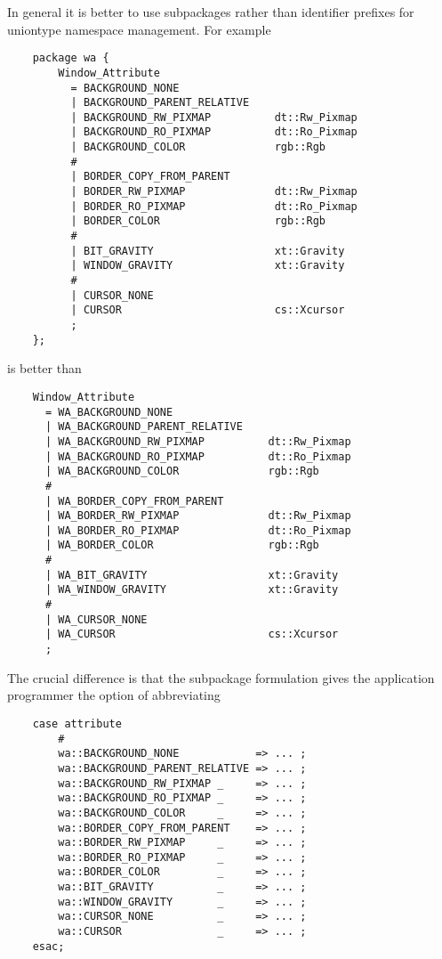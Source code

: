 In general it is better to use subpackages rather than identifier prefixes 
for uniontype namespace management.  For example

\begin{verbatim}
    package wa {
        Window_Attribute
          = BACKGROUND_NONE
          | BACKGROUND_PARENT_RELATIVE
          | BACKGROUND_RW_PIXMAP          dt::Rw_Pixmap
          | BACKGROUND_RO_PIXMAP          dt::Ro_Pixmap
          | BACKGROUND_COLOR              rgb::Rgb
          #
          | BORDER_COPY_FROM_PARENT
          | BORDER_RW_PIXMAP              dt::Rw_Pixmap
          | BORDER_RO_PIXMAP              dt::Ro_Pixmap
          | BORDER_COLOR                  rgb::Rgb
          #
          | BIT_GRAVITY                   xt::Gravity
          | WINDOW_GRAVITY                xt::Gravity
          #
          | CURSOR_NONE
          | CURSOR                        cs::Xcursor
          ;
    };
\end{verbatim}

is better than

\begin{verbatim}
    Window_Attribute
      = WA_BACKGROUND_NONE
      | WA_BACKGROUND_PARENT_RELATIVE
      | WA_BACKGROUND_RW_PIXMAP          dt::Rw_Pixmap
      | WA_BACKGROUND_RO_PIXMAP          dt::Ro_Pixmap
      | WA_BACKGROUND_COLOR              rgb::Rgb
      #
      | WA_BORDER_COPY_FROM_PARENT
      | WA_BORDER_RW_PIXMAP              dt::Rw_Pixmap
      | WA_BORDER_RO_PIXMAP              dt::Ro_Pixmap
      | WA_BORDER_COLOR                  rgb::Rgb
      #
      | WA_BIT_GRAVITY                   xt::Gravity
      | WA_WINDOW_GRAVITY                xt::Gravity
      #
      | WA_CURSOR_NONE
      | WA_CURSOR                        cs::Xcursor
      ;
\end{verbatim}

The crucial difference is that the subpackage formulation gives 
the application programmer the option of abbreviating

\begin{verbatim}
    case attribute
        #
        wa::BACKGROUND_NONE            => ... ;
        wa::BACKGROUND_PARENT_RELATIVE => ... ;
        wa::BACKGROUND_RW_PIXMAP _     => ... ;
        wa::BACKGROUND_RO_PIXMAP _     => ... ;
        wa::BACKGROUND_COLOR     _     => ... ;
        wa::BORDER_COPY_FROM_PARENT    => ... ;
        wa::BORDER_RW_PIXMAP     _     => ... ;
        wa::BORDER_RO_PIXMAP     _     => ... ;
        wa::BORDER_COLOR         _     => ... ;
        wa::BIT_GRAVITY          _     => ... ; 
        wa::WINDOW_GRAVITY       _     => ... ;
        wa::CURSOR_NONE          _     => ... ;
        wa::CURSOR               _     => ... ;
    esac;
\end{verbatim}

